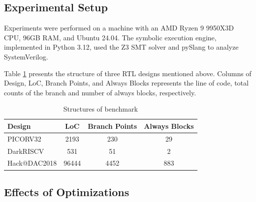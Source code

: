 \documentclass[conference]{IEEEtran}
\begin{document}
\subsection{Experimental Setup}
Experiments were performed on a machine with an AMD Ryzen 9 9950X3D CPU, 96GB RAM, and Ubuntu 24.04. The symbolic execution engine, implemented in Python 3.12, used the Z3 SMT solver and pySlang to analyze SystemVerilog.

Table \ref{tab1_1} presents the structure of three RTL designs mentioned above. Columns of Design,  LoC, Branch Points, and Always Blocks represents the line of code, total counts of the branch and number of always blocks, respectively.
\begin{table}[ht]
    \centering
    \begin{tabular}{l|c|c|c}
    \hline
    Design & LoC & Branch Points & Always Blocks \\
    \hline
    PICORV32 & 2193 & 230 & 29 \\
    \hline
    DarkRISCV & 531 & 51 & 2 \\
    \hline
    Hack@DAC2018 & 96444 & 4452 & 883 \\
    \hline
    \end{tabular}
    \vspace{5pt}
    \caption{Structures of benchmark}
    \label{tab1_1}
\end{table}
\vspace{-20pt}

\subsection{Effects of Optimizations}
\end{document}
